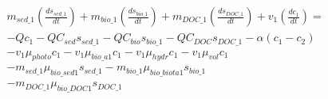 \documentclass[fleqn, oneside, 11pt]{article}%
\begin{document}
\begin{preview}
\begin{align*}%
&m_{sed\_1} \left(\frac{ds_{sed\_1}}{dt}\right) + m_{bio\_1} \left(\frac{ds_{bio\_1}}{dt}\right) + m_{DOC\_1} \left(\frac{ds_{DOC\_1}}{dt}\right) + v_{1} \left(\frac{dc_{1}}{dt}\right) = \nonumber \\
&-Qc_{1} - QC_{sed}s_{sed\_1} - QC_{bio}s_{bio\_1} - QC_{DOC}s_{DOC\_1} - \alpha(c_{1} - c_{2}) \nonumber \\
&-v_{1}\mu_{photo}c_{1} - v_{1}\mu_{bio\_a1}c_{1} - v_{1}\mu_{hydr}c_{1} - v_{1}\mu_{vol}c_{1} \nonumber \\
&-m_{sed\_1}\mu_{bio\_sed1}s_{sed\_1} - m_{bio\_1}\mu_{bio\_biota1}s_{bio\_1} \nonumber \\
&-m_{DOC\_1}\mu_{bio\_DOC1}s_{DOC\_1} \nonumber \\
\end{align*} 
\end{preview}
\end{document}
